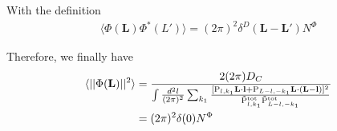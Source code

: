 \documentclass[12pt]{article}
\newcommand{\beq}{\begin{equation}}
\newcommand{\eeq}{\end{equation}}
\newcommand{\beqal}{\begin{aligned}}
\newcommand{\eeqal}{\end{aligned}}
\def\l{{\bf l}}
\def\L{{\bf L}}
\def\pul{{\rm P}}
\def\ptot{{\tilde{\rm P}^{\rm tot}}}
\def\d2l{\frac{d^2l}{(2\pi)^2}}
\def\dko{\frac{dk_1}{2\pi}}
\numberwithin{equation}{section}
\begin{document}
%
%
%
%
With the definition
\begin{eqnarray}
\langle \Phi(\textbf{L}) \Phi^*(L') \rangle  = (2\pi)^2 \delta^D(\textbf{L} - \textbf{L}') N^\Phi
\end{eqnarray}

Therefore, we finally have
\beq
\beqal
\langle ||\Phi(\L)||^2\rangle 
& =   \frac{2 (2\pi) D_C}{\int \frac{d^2 l}{(2\pi)^2} \sum_{k_1} \frac{[\pul_{l,k_1} \L\cdot \l +
		\pul_{L-l,-k_1} \L\cdot (\L-\l)]^2}{\ptot_{l,k_1}\ptot_{L-l,-k_1}} }
\\
& = (2\pi)^2 \delta(0) N^\Phi
\eeqal
\eeq
\end{document}
